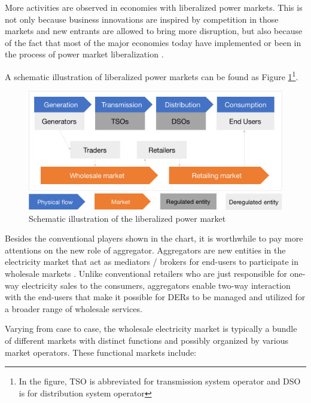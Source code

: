 More activities are observed in economies with liberalized power markets. This is not only because business innovations are inspired by competition in those markets and new entrants are allowed to bring more disruption, but also because of the fact that most of the major economies today have implemented or been in the process of power market liberalization \cite{Ranci2013,Vagliasindi2013}.

A schematic illustration of liberalized power markets can be found as Figure \ref{fig:PowerMarketSchematic}\footnote{In the figure, TSO is abbreviated for transmission system operator and DSO is for distribution system operator}.

\begin{figure}[h!]
	\centering
	\includegraphics[width=0.95\linewidth]{Figures/PowerMarketSchematic}
	\caption{Schematic illustration of the liberalized power market}
	\label{fig:PowerMarketSchematic}
\end{figure}

Besides the conventional players shown in the chart, it is worthwhile to pay more attentions on the new role of aggregator. Aggregators are new entities in the electricity market that act as mediators / brokers for end-users to participate in wholesale markets \cite{He2011,Gkatzikis2013,Rahnama2014,HenriquezAuba2017,Lipari2017}. Unlike conventional retailers who are just responsible for one-way electricity sales to the consumers, aggregators enable two-way interaction with the end-users that make it possible for DERs to be managed and utilized for a broader range of wholesale services. 
 
Varying from case to case, the wholesale electricity market is typically a bundle of different markets with distinct functions and possibly organized by various market operators. These functional markets include:

